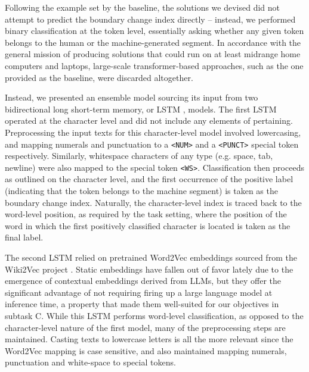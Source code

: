 Following the example set by the baseline, the solutions we devised did not attempt to predict the boundary change index directly -- instead, we performed binary classification at the token level, essentially asking whether any given token belongs to the human or the machine-generated segment.
In accordance with the general mission of producing solutions that could run on at least midrange home computers and laptops, large-scale transformer-based approaches, such as the one provided as the baseline, were discarded altogether.

Instead, we presented an ensemble model sourcing its input from two bidirectional long short-term memory, or LSTM \citep{hochreiter1997long}, models.
The first LSTM operated at the character level and did not include any elements of pertaining.
Preprocessing the input texts for this character-level model involved lowercasing, and mapping numerals and punctuation to a \verb|<NUM>| and a \verb|<PUNCT>| special token respectively.
Similarly, whitespace characters of any type (e.g. space, tab, newline) were also mapped to the special token \verb|<WS>|.
Classification then proceeds as outlined on the character level, and the first occurrence of the positive label (indicating that the token belongs to the machine segment) is taken as the boundary change index.
Naturally, the character-level index is traced back to the word-level position, as required by the task setting, where the position of the word in which the first positively classified character is located is taken as the final label.

The second LSTM relied on pretrained Word2Vec \citep{mikolov2013efficientestimationwordrepresentations} embeddings sourced from the Wiki2Vec project \citep{yamada2020wikipedia2vec}. Static embeddings have fallen out of favor lately due to the emergence of contextual embeddings derived from LLMs, but they offer the significant advantage of not requiring firing up a large language model at inference time, a property that made them well-suited for our objectives in subtask C.
While this LSTM performs word-level classification, as opposed to the character-level nature of the first model, many of the preprocessing steps are maintained.
Casting texts to lowercase letters is all the more relevant since the Word2Vec mapping is case sensitive, and also maintained mapping numerals, punctuation and white-space to special tokens.

